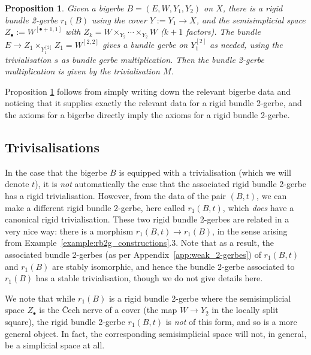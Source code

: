 \documentclass[12pt]{amsart}
\theoremstyle{plain}
\newtheorem{proposition}[theorem]{Proposition}
\theoremstyle{definition}
\theoremstyle{remark}
\numberwithin{equation}{section}
\newcommand{\<}{\langle}
\renewcommand{\>}{\rangle}
\begin{document}
\begin{proposition}\label{prop:bigerbe_to_rgb2g}
    Given a bigerbe $B = (E,W,Y_1,Y_2)$ on $X$, there is a rigid bundle 2-gerbe $r_1(B)$ using the cover $Y:= Y_1\to X$, and the semisimplicial space $Z_\bullet :=W^{[\bullet+1,1]}$ with $Z_k = W\times_{Y_2} \cdots \times_{Y_2} W$ ($k+1$ factors).
    The bundle $E\to Z_1 \times_{Y_1^{[2]}} Z_1 = W^{[2,2]}$ gives a bundle gerbe on $Y_1^{[2]}$ as needed, using the trivialisation $s$ as bundle gerbe multiplication. 
    Then the bundle 2-gerbe multiplication is given by the trivialisation $M$.
\end{proposition}

Proposition \ref{prop:bigerbe_to_rgb2g} follows from simply writing down the relevant bigerbe data and noticing that it supplies exactly the relevant data for a rigid bundle 2-gerbe, and the axioms for a bigerbe directly imply the axioms for a rigid bundle 2-gerbe.


\subsection{Trivisalisations}

In the case that the bigerbe $B$ is equipped with a trivialisation (which we will denote $t$), it is \emph{not} automatically the case that the associated rigid bundle 2-gerbe has a rigid trivialisation.
However, from the data of the pair $(B,t)$, we can make a different rigid bundle 2-gerbe, here called $r_1(B,t)$, which \emph{does} have a canonical rigid trivialisation.
These two rigid bundle 2-gerbes are related in a very nice way: there is a morphism  $r_1(B,t)\to r_1(B)$, in the sense arising from Example~\ref{example:rb2g_constructions}.3.
Note that as a result, the associated bundle 2-gerbes (as per Appendix~\ref{app:weak_2-gerbes}) of $r_1(B,t)$ and $r_1(B)$ are stably isomorphic, and hence the bundle 2-gerbe associated to $r_1(B)$ has a stable trivialisation, though we do not give details here.

We note that while $r_1(B)$ is a rigid bundle 2-gerbe where the semisimplicial space $Z_\bullet$ is the \v{C}ech nerve of a cover (the map $W\to Y_2$ in the locally split square), the rigid bundle 2-gerbe $r_1(B,t)$ is \emph{not} of this form, and so is a more general object.
In fact, the corresponding semisimplicial space will not, in general, be a simplicial space at all.
\end{document}
